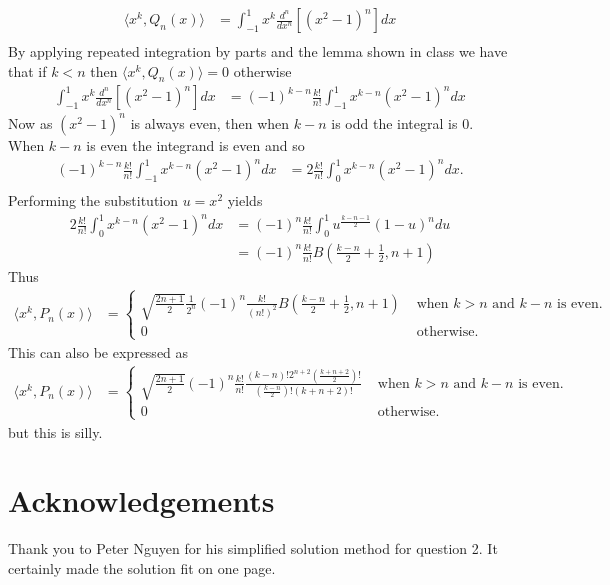 \documentclass{unswmaths}
\begin{document}
\begin{align*}
	\langle x^k, Q_n(x) \rangle 
		&= \int_{-1}^{1} x^k \frac{d^n}{dx^n} \left[ (x^2 - 1)^n \right] dx\\
\end{align*}
By applying repeated integration by parts and the lemma shown in class we have that if $ k < n $ then $ \langle x^k, Q_n(x) \rangle  = 0 $
otherwise
\begin{align*}
	\int_{-1}^{1} x^k \frac{d^n}{dx^n} \left[ (x^2 - 1)^n \right] dx
		&= (-1)^{k-n}\frac{k!}{n!} \int_{-1}^{1} x^{k-n} (x^2 - 1)^n dx 
\end{align*}
Now as $ (x^2 - 1)^n $ is always even, then when $ k - n $ is odd the integral is $ 0 $. When $ k - n $ is even
the integrand is even and so 
\begin{align*}
	(-1)^{k-n}\frac{k!}{n!} \int_{-1}^{1} x^{k-n} (x^2 - 1)^n dx
		&= 2\frac{k!}{n!}\int_0^1 x^{k-n} (x^2 - 1)^n dx. \\
\end{align*}
Performing the substitution $ u = x^2 $ yields
\begin{align*}
	2\frac{k!}{n!}\int_{0}^{1} x^{k-n} (x^2 - 1)^n dx
		&= (-1)^n \frac{k!}{n!}\int_0^1 u^{\frac{k-n-1}{2}}(1-u)^n du \\
		&= (-1)^n \frac{k!}{n!}B(\frac{k-n}{2} + \frac{1}{2}, n+1) 
\end{align*}
Thus 
\begin{align*}
	\langle x^k, P_n(x) \rangle &= 
		\begin{cases}
			\sqrt{\frac{2n+1}{2}} \frac{1}{2^n} (-1)^n \frac{k!}{(n!)^2} B(\frac{k-n}{2} + \frac{1}{2}, n + 1) & \text{ when }  k > n \text{ and }  k - n \text{ is even. } \\
			0 & \text{ otherwise. }
		\end{cases}
\end{align*}
This can also be expressed as
\begin{align*}
	\langle x^k, P_n(x) \rangle &= 
		\begin{cases}
			\sqrt{\frac{2n+1}{2}} (-1)^n \frac{k!}{n!} \frac{(k-n)!2^{n+2}\left( \frac{k+n+2}{2}\right)!}{\left( \frac{k-n}{2} \right)! (k+n+2)!} & \text{ when }  k > n \text{ and }  k - n \text{ is even. } \\
			0 & \text{ otherwise. }
		\end{cases}
\end{align*}
but this is silly.

\section*{Acknowledgements}
Thank you to Peter Nguyen for his simplified solution method for question 2. 
It certainly made the solution fit on one page.
\end{document}
